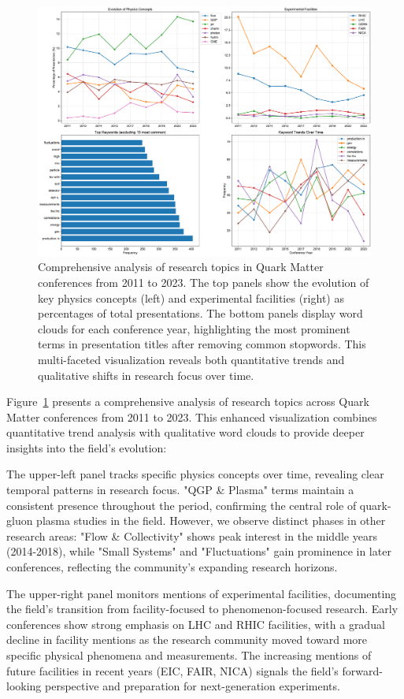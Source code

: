 \documentclass[a4paper,11pt]{article}
\begin{document}
\begin{figure}[H]
\centering
\includegraphics[width=\textwidth]{figures/QM_keyword_analysis.pdf}
\caption{Comprehensive analysis of research topics in Quark Matter conferences from 2011 to 2023. The top panels show the evolution of key physics concepts (left) and experimental facilities (right) as percentages of total presentations. The bottom panels display word clouds for each conference year, highlighting the most prominent terms in presentation titles after removing common stopwords. This multi-faceted visualization reveals both quantitative trends and qualitative shifts in research focus over time.}
\label{fig:keywords}
\end{figure}

Figure~\ref{fig:keywords} presents a comprehensive analysis of research topics across Quark Matter conferences from 2011 to 2023. This enhanced visualization combines quantitative trend analysis with qualitative word clouds to provide deeper insights into the field's evolution:

The upper-left panel tracks specific physics concepts over time, revealing clear temporal patterns in research focus. "QGP \& Plasma" terms maintain a consistent presence throughout the period, confirming the central role of quark-gluon plasma studies in the field. However, we observe distinct phases in other research areas: "Flow \& Collectivity" shows peak interest in the middle years (2014-2018), while "Small Systems" and "Fluctuations" gain prominence in later conferences, reflecting the community's expanding research horizons.

The upper-right panel monitors mentions of experimental facilities, documenting the field's transition from facility-focused to phenomenon-focused research. Early conferences show strong emphasis on LHC and RHIC facilities, with a gradual decline in facility mentions as the research community moved toward more specific physical phenomena and measurements. The increasing mentions of future facilities in recent years (EIC, FAIR, NICA) signals the field's forward-looking perspective and preparation for next-generation experiments.
\end{document}
